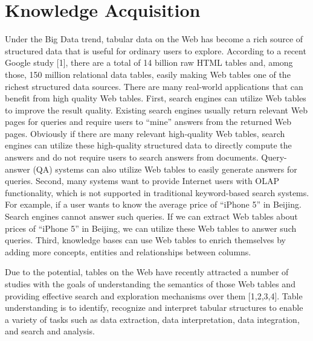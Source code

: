 \documentclass{article} %
\begin{document}
\section{Knowledge Acquisition}
Under the Big Data trend, tabular data on the Web has become a rich source of structured data that is useful for ordinary users to explore.  According to a recent Google study [1], there are a total of 14 billion raw HTML tables and, among those, 150 million relational data tables, easily making Web tables one of the richest structured data sources. There are many real-world applications that can benefit from high quality Web tables. First, search engines can utilize Web tables to improve the result quality. Existing search engines usually return relevant Web pages for queries and require users to “mine” answers from the returned Web pages. Obviously if there are many relevant high-quality Web tables, search engines can utilize these high-quality structured data to directly compute the answers and do not require users to search answers from documents. Query-answer (QA) systems can also utilize Web tables to easily generate answers for queries. Second, many systems want to provide Internet users with OLAP functionality, which is not supported in traditional keyword-based search systems. For example, if a user wants to know the average price of “iPhone 5” in Beijing. Search engines cannot answer such queries. If we can extract Web tables about prices of “iPhone 5” in Beijing, we can utilize these Web tables to answer such queries. Third, knowledge bases can use Web tables to enrich themselves by adding more concepts, entities and relationships between columns.

Due to the potential, tables on the Web have recently attracted a number of studies with the goals of understanding the semantics of those Web tables and providing effective search and exploration mechanisms over them [1,2,3,4]. Table understanding is to identify, recognize and interpret tabular structures to enable a variety of tasks such as data extraction, data interpretation, data integration, and search and analysis.
\end{document}
